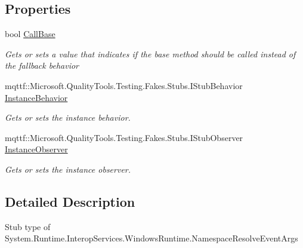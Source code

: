 \subsection*{Properties}
\begin{DoxyCompactItemize}
\item 
bool \hyperlink{class_system_1_1_runtime_1_1_interop_services_1_1_windows_runtime_1_1_fakes_1_1_stub_namespace_resolve_event_args_a16cecf60384e05ae685d4194b3b9c624}{Call\-Base}
\begin{DoxyCompactList}\small\item\em Gets or sets a value that indicates if the base method should be called instead of the fallback behavior\end{DoxyCompactList}\item 
mqttf\-::\-Microsoft.\-Quality\-Tools.\-Testing.\-Fakes.\-Stubs.\-I\-Stub\-Behavior \hyperlink{class_system_1_1_runtime_1_1_interop_services_1_1_windows_runtime_1_1_fakes_1_1_stub_namespace_resolve_event_args_a65c423217d1485ba2508026a1b94bf18}{Instance\-Behavior}
\begin{DoxyCompactList}\small\item\em Gets or sets the instance behavior.\end{DoxyCompactList}\item 
mqttf\-::\-Microsoft.\-Quality\-Tools.\-Testing.\-Fakes.\-Stubs.\-I\-Stub\-Observer \hyperlink{class_system_1_1_runtime_1_1_interop_services_1_1_windows_runtime_1_1_fakes_1_1_stub_namespace_resolve_event_args_ae0d103c8bf4bde838c34f8cd7d290c71}{Instance\-Observer}
\begin{DoxyCompactList}\small\item\em Gets or sets the instance observer.\end{DoxyCompactList}\end{DoxyCompactItemize}


\subsection{Detailed Description}
Stub type of System.\-Runtime.\-Interop\-Services.\-Windows\-Runtime.\-Namespace\-Resolve\-Event\-Args



